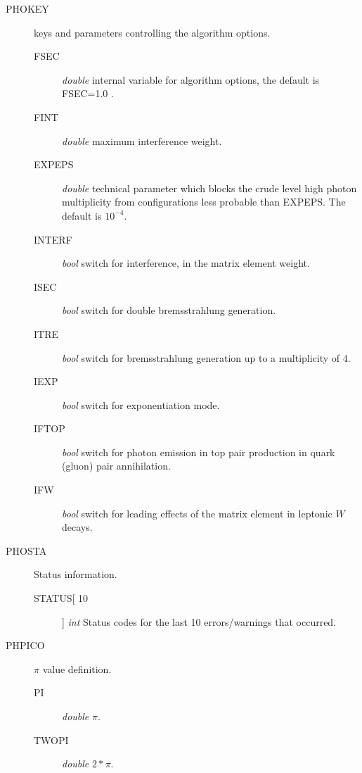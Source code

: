 \documentclass[]{Photos_interface_design}
\begin{document}
\begin{description}
\item[PHOKEY] keys and parameters controlling the algorithm options.
    \begin{description}
	\item[FSEC]   \textit{double} internal variable for algorithm options, the default is FSEC=1.0\; .
	\item[FINT]   \textit{double} maximum interference weight.
	\item[EXPEPS] \textit{double} technical parameter which blocks the crude level high photon multiplicity from configurations less probable than EXPEPS. The default is $10^{-4}$.
	\item[INTERF] \textit{bool} switch for interference, in the matrix element weight.
	\item[ISEC]   \textit{bool} switch for double bremsstrahlung generation.
	\item[ITRE]   \textit{bool} switch for bremsstrahlung generation up to a multiplicity of 4.
	\item[IEXP]   \textit{bool} switch for exponentiation mode.
	\item[IFTOP]  \textit{bool} switch for photon emission in top pair production in quark (gluon) pair annihilation.
	\item[IFW]    \textit{bool} switch for leading effects of the matrix element in leptonic $W$ decays.
    \end{description}
\end{description}

\begin{description}
\item[PHOSTA] Status information.
    \begin{description}
    \item[STATUS[ 10]]  \textit{int} Status codes for the last 10 errors/warnings
    that occurred.
    \end{description}
\end{description}

\begin{description}
\item[PHPICO] $\pi$ value definition.
    \begin{description}
    \item[PI]  \textit{double} $\pi$.
	\item[TWOPI]  \textit{double} $2*\pi$.
    \end{description}
\end{description}
\end{document}
